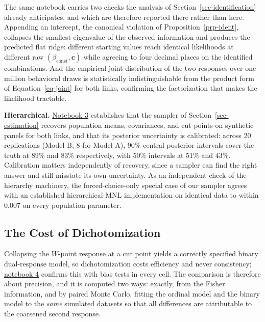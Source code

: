 \documentclass[
  letterpaper,
  DIV=11,
  numbers=noendperiod]{scrartcl}
\theoremstyle{plain}
\theoremstyle{plain}
\theoremstyle{remark}
\begin{document}
The same notebook carries two checks the analysis of
Section~\ref{sec-identification} already anticipates, and which are
therefore reported there rather than here. Appending an intercept, the
canonical violation of Proposition~\ref{prp-ident}, collapses the
smallest eigenvalue of the observed information and produces the
predicted flat ridge: different starting values reach identical
likelihoods at different raw \((\beta_{\text{const}}, \mathbf{c})\)
while agreeing to four decimal places on the identified combinations.
And the empirical joint distribution of the two responses over one
million behavioral draws is statistically indistinguishable from the
product form of Equation~\ref{eq-joint} for both links, confirming the
factorization that makes the likelihood tractable.

\textbf{Hierarchical.}
\href{notebooks/03-hierarchical-recovery.qmd}{Notebook 3} establishes
that the sampler of Section~\ref{sec-estimation} recovers population
means, covariances, and cut points on synthetic panels for both links,
and that its posterior uncertainty is calibrated: across 20 replications
(Model B; 8 for Model A), 90\% central posterior intervals cover the
truth at 89\% and 83\% respectively, with 50\% intervals at 51\% and
43\%. Calibration matters independently of recovery, since a sampler can
find the right answer and still misstate its own uncertainty. As an
independent check of the hierarchy machinery, the forced-choice-only
special case of our sampler agrees with an established hierarchical-MNL
implementation on identical data to within 0.007 on every population
parameter.

\subsection{The Cost of Dichotomization}\label{sec-sim-benchmarks}

Collapsing the \(W\)-point response at a cut point yields a correctly
specified binary dual-response model, so dichotomization costs
efficiency and never consistency;
\href{notebooks/04-dichotomization-cost.qmd}{notebook 4} confirms this
with bias tests in every cell. The comparison is therefore about
precision, and it is computed two ways: exactly, from the Fisher
information, and by paired Monte Carlo, fitting the ordinal model and
the binary model to the \emph{same} simulated datasets so that all
differences are attributable to the coarsened second response.
\end{document}
